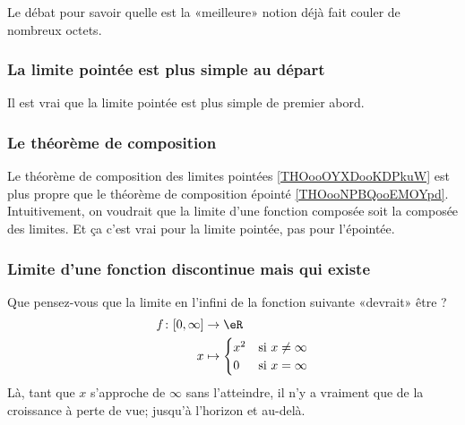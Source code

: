 Le débat pour savoir quelle est la «meilleure» notion déjà fait couler de nombreux octets\cite{BIBooKNWHooBRoxme,BIBooNUKAooVMqppa,BIBooDILKooUcmUVD,BIBooJDPPooVONaQV,BIBooUIAFooHqKjQh}.


\subsubsection{La limite pointée est plus simple au départ}

Il est vrai que la limite pointée est plus simple de premier abord.

\subsubsection{Le théorème de composition}

Le théorème de composition des limites pointées \ref{THOooOYXDooKDPkuW} est plus propre que le théorème de composition épointé \ref{THOooNPBQooEMOYpd}. Intuitivement, on voudrait que la limite d'une fonction composée soit la composée des limites. Et ça c'est vrai pour la limite pointée, pas pour l'épointée.

\subsubsection{Limite d'une fonction discontinue mais qui existe}

Que pensez-vous que la limite en l'infini de la fonction suivante «devrait» être ?
\begin{equation}
	\begin{aligned}
		f\colon \mathopen[ 0 , \infty \mathclose] & \to \eR                            \\
		x                                         & \mapsto \begin{cases}
			x^2 & \text{si } x\neq \infty \\
			0   & \text{si }x=\infty
		\end{cases}
	\end{aligned}
\end{equation}
Là, tant que \( x\) s'approche de \( \infty\) sans l'atteindre, il n'y a vraiment que de la croissance à perte de vue; jusqu'à l'horizon et au-delà.

